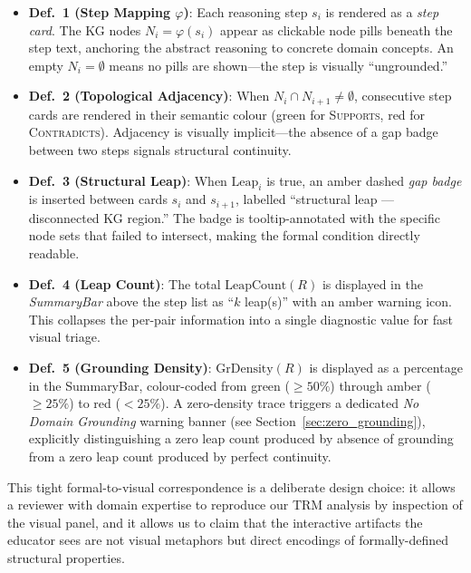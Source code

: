 \documentclass[journal,review]{vgtc}
\begin{document}
\begin{itemize}
  \item \textbf{Def.~1 (Step Mapping $\varphi$)}: Each reasoning step $s_i$ is rendered as a \textit{step card}. The KG nodes $N_i = \varphi(s_i)$ appear as clickable node pills beneath the step text, anchoring the abstract reasoning to concrete domain concepts. An empty $N_i = \emptyset$ means no pills are shown---the step is visually ``ungrounded.''

  \item \textbf{Def.~2 (Topological Adjacency)}: When $N_i \cap N_{i+1} \neq \emptyset$, consecutive step cards are rendered in their semantic colour (green for \textsc{Supports}, red for \textsc{Contradicts}). Adjacency is visually implicit---the absence of a gap badge between two steps signals structural continuity.

  \item \textbf{Def.~3 (Structural Leap)}: When $\text{Leap}_i$ is true, an amber dashed \textit{gap badge} is inserted between cards $s_i$ and $s_{i+1}$, labelled ``structural leap --- disconnected KG region.'' The badge is tooltip-annotated with the specific node sets that failed to intersect, making the formal condition directly readable.

  \item \textbf{Def.~4 (Leap Count)}: The total $\text{LeapCount}(R)$ is displayed in the \textit{SummaryBar} above the step list as ``$k$ leap(s)'' with an amber warning icon. This collapses the per-pair information into a single diagnostic value for fast visual triage.

  \item \textbf{Def.~5 (Grounding Density)}: $\text{GrDensity}(R)$ is displayed as a percentage in the SummaryBar, colour-coded from green ($\geq 50\%$) through amber ($\geq 25\%$) to red ($< 25\%$). A zero-density trace triggers a dedicated \textit{No Domain Grounding} warning banner (see Section~\ref{sec:zero_grounding}), explicitly distinguishing a zero leap count produced by absence of grounding from a zero leap count produced by perfect continuity.
\end{itemize}

This tight formal-to-visual correspondence is a deliberate design choice: it allows a reviewer with domain expertise to reproduce our TRM analysis by inspection of the visual panel, and it allows us to claim that the interactive artifacts the educator sees are not visual metaphors but direct encodings of formally-defined structural properties.
\end{document}
